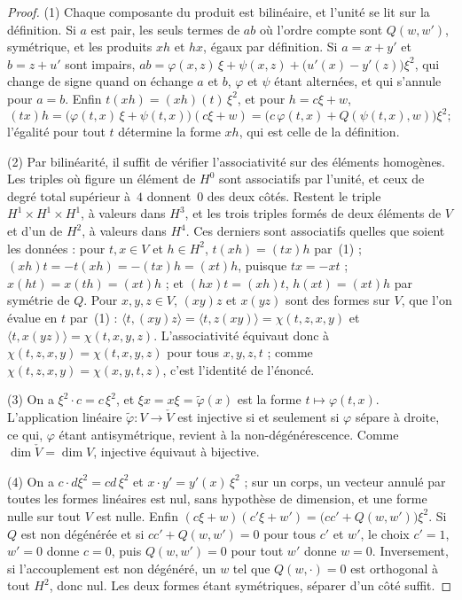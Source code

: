 \begin{proof}
(1) Chaque composante du produit est bilinéaire, et l'unité se lit sur la définition. Si $a$ est pair, les seuls termes de $ab$ où l'ordre compte sont $Q(w, w')$, symétrique, et les produits $xh$ et $hx$, égaux par définition. Si $a = x + y'$ et $b = z + u'$ sont impairs, $ab = \varphi(x,z)\,\xi + \psi(x,z) + \bigl(u'(x) - y'(z)\bigr)\xi^2$, qui change de signe quand on échange $a$ et $b$, $\varphi$ et $\psi$ étant alternées, et qui s'annule pour $a = b$. Enfin $t(xh) = (xh)(t)\,\xi^2$, et pour $h = c\xi + w$,
\[
(tx)h = \bigl(\varphi(t,x)\,\xi + \psi(t,x)\bigr)(c\xi + w) = \bigl(c\,\varphi(t,x) + Q(\psi(t,x), w)\bigr)\xi^2 ;
\]
l'égalité pour tout $t$ détermine la forme $xh$, qui est celle de la définition.

(2) Par bilinéarité, il suffit de vérifier l'associativité sur des éléments homogènes. Les triples où figure un élément de $H^0$ sont associatifs par l'unité, et ceux de degré total supérieur à~$4$ donnent~$0$ des deux côtés. Restent le triple $H^1 \times H^1 \times H^1$, à valeurs dans $H^3$, et les trois triples formés de deux éléments de $V$ et d'un de $H^2$, à valeurs dans $H^4$. Ces derniers sont associatifs quelles que soient les données : pour $t, x \in V$ et $h \in H^2$, $t(xh) = (tx)h$ par~(1) ; $(xh)t = -t(xh) = -(tx)h = (xt)h$, puisque $tx = -xt$ ; $x(ht) = x(th) = (xt)h$ ; et $(hx)t = (xh)t$, $h(xt) = (xt)h$ par symétrie de $Q$. Pour $x, y, z \in V$, $(xy)z$ et $x(yz)$ sont des formes sur $V$, que l'on évalue en $t$ par~(1) : $\langle t, (xy)z \rangle = \langle t, z(xy) \rangle = \chi(t,z,x,y)$ et $\langle t, x(yz) \rangle = \chi(t,x,y,z)$. L'associativité équivaut donc à $\chi(t,z,x,y) = \chi(t,x,y,z)$ pour tous $x, y, z, t$ ; comme $\chi(t,z,x,y) = \chi(x,y,t,z)$, c'est l'identité de l'énoncé.

(3) On a $\xi^2 \cdot c = c\,\xi^2$, et $\xi x = x\xi = \tilde\varphi(x)$ est la forme $t \mapsto \varphi(t,x)$. L'application linéaire $\tilde\varphi \colon V \to \check V$ est injective si et seulement si $\varphi$ sépare à droite, ce qui, $\varphi$ étant antisymétrique, revient à la non-dégénérescence. Comme $\dim \check V = \dim V$, injective équivaut à bijective.

(4) On a $c \cdot d\xi^2 = cd\,\xi^2$ et $x \cdot y' = y'(x)\,\xi^2$ ; sur un corps, un vecteur annulé par toutes les formes linéaires est nul, sans hypothèse de dimension, et une forme nulle sur tout $V$ est nulle. Enfin $(c\xi + w)(c'\xi + w') = \bigl(cc' + Q(w,w')\bigr)\xi^2$. Si $Q$ est non dégénérée et si $cc' + Q(w,w') = 0$ pour tous $c'$ et $w'$, le choix $c' = 1$, $w' = 0$ donne $c = 0$, puis $Q(w, w') = 0$ pour tout $w'$ donne $w = 0$. Inversement, si l'accouplement est non dégénéré, un $w$ tel que $Q(w, \cdot) = 0$ est orthogonal à tout $H^2$, donc nul. Les deux formes étant symétriques, séparer d'un côté suffit.
\end{proof}

